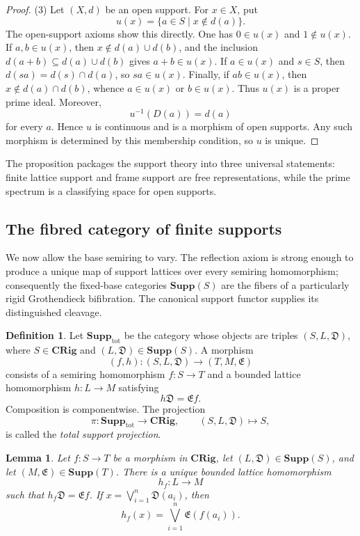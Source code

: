 \documentclass[12pt,leqno]{amsart}
\newcommand{\CRig}{\mathbf{CRig}}
\newcommand{\Supp}{\mathbf{Supp}}
\newcommand{\TotSupp}{\mathbf{Supp}_{\mathrm{tot}}}
\newtheorem{lemma}[theorem]{Lemma}
\theoremstyle{definition}
\newtheorem{definition}{Definition}[section]
\numberwithin{equation}{section}
\theoremstyle{remark}
\begin{document}
\begin{proof}
(3) Let \((X,d)\) be an open support. For \(x\in X\), put
\[
u(x)=\{a\in S\mid x\notin d(a)\}.
\]
The open-support axioms show this directly. One has \(0\in u(x)\) and \(1\notin u(x)\). If \(a,b\in u(x)\), then
\(x\notin d(a)\cup d(b)\), and the inclusion
\(d(a+b)\subseteq d(a)\cup d(b)\) gives \(a+b\in u(x)\). If \(a\in u(x)\) and \(s\in S\), then
\(d(sa)=d(s)\cap d(a)\), so \(sa\in u(x)\). Finally, if \(ab\in u(x)\), then
\(x\notin d(a)\cap d(b)\), whence \(a\in u(x)\) or \(b\in u(x)\). Thus \(u(x)\) is a proper prime ideal. Moreover,
\[
u^{-1}(D(a))=d(a)
\]
for every $a$. Hence $u$ is continuous and is a morphism of open supports. Any such morphism is determined by this membership condition, so $u$ is unique.
\end{proof}

The proposition packages the support theory into three universal statements: finite lattice support and frame support are free representations, while the prime spectrum is a classifying space for open supports.

\subsection{The fibred category of finite supports}\label{subsec:support-bifibration}

We now allow the base semiring to vary. The reflection axiom is strong enough to produce a unique map of support lattices over every semiring homomorphism; consequently the fixed-base categories \(\Supp(S)\) are the fibers of a particularly rigid Grothendieck bifibration. The canonical support functor supplies its distinguished cleavage.

\begin{definition}\label{def:total-support-category}
Let \(\TotSupp\) be the category whose objects are triples
\((S,L,\mathfrak D)\), where \(S\in\CRig\) and \((L,\mathfrak D)\in\Supp(S)\). A morphism
\[
(f,h)\colon(S,L,\mathfrak D)\longrightarrow(T,M,\mathfrak E)
\]
consists of a semiring homomorphism \(f\colon S\to T\) and a bounded lattice homomorphism \(h\colon L\to M\) satisfying
\[
h\mathfrak D=\mathfrak E f.
\]
Composition is componentwise. The projection
\[
\pi\colon\TotSupp\longrightarrow\CRig,
\qquad
(S,L,\mathfrak D)\longmapsto S,
\]
is called the \emph{total support projection}.
\end{definition}

\begin{lemma}\label{lem:support-change-of-scalars}
Let \(f\colon S\to T\) be a morphism in \(\CRig\), let
\((L,\mathfrak D)\in\Supp(S)\), and let
\((M,\mathfrak E)\in\Supp(T)\). There is a unique bounded lattice homomorphism
\[
h_f\colon L\longrightarrow M
\]
such that \(h_f\mathfrak D=\mathfrak E f\). If
\(x=\bigvee_{i=1}^n\mathfrak D(a_i)\), then
\[
h_f(x)=\bigvee_{i=1}^n\mathfrak E(f(a_i)).
\]
\end{lemma}
\end{document}
